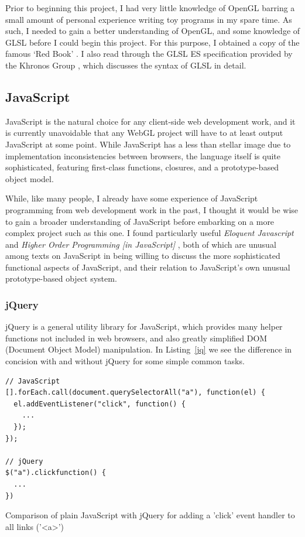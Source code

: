 \documentclass[12pt,twoside,notitlepage]{report}
\begin{document}
Prior to beginning this project, I had very little knowledge of OpenGL barring a small amount of personal experience writing toy programs in my spare time. As such, I needed to gain a better understanding of OpenGL, and some knowledge of GLSL before I could begin this project. For this purpose, I obtained a copy of the famous `Red Book' \citet{redbook}. I also read through the GLSL ES specification provided by the Khronos Group \citet{glsl-spec}, which discusses the syntax of GLSL in detail.

\subsection*{JavaScript}
JavaScript is the natural choice for any client-side web development work, and it is currently unavoidable that any WebGL project will have to at least output JavaScript at some point. While JavaScript has a less than stellar image due to implementation inconsistencies between browsers, the language itself is quite sophisticated, featuring first-class functions, closures, and a prototype-based object model.

While, like many people, I already have some experience of JavaScript programming from web development work in the past, I thought it would be wise to gain a broader understanding of JavaScript before embarking on a more complex project such as this one. I found particularly useful {\it Eloquent Javascript }\citet{eloquent} and {\it Higher Order Programming [in JavaScript] }\citet{higher-order}, both of which are unusual among texts on JavaScript in being willing to discuss the more sophisticated functional aspects of JavaScript, and their relation to JavaScript's own unusual prototype-based object system.

\subsubsection{jQuery}
jQuery is a general utility library for JavaScript, which provides many helper functions not included in web browsers, and also greatly simplified DOM (Document Object Model) manipulation. In Listing~\ref{jq} we see the difference in concision with and without jQuery for some simple common tasks.

\begin{listing}[H]
\begin{verbatim}
// JavaScript
[].forEach.call(document.querySelectorAll("a"), function(el) {
  el.addEventListener("click", function() {
    ...
  });
});

// jQuery
$("a").clickfunction() {
  ...
})

\end{verbatim}
\caption{Comparison of plain JavaScript with jQuery for adding a 'click' event handler to all links ('<a>')\label{jq}}
\end{listing}
\end{document}
